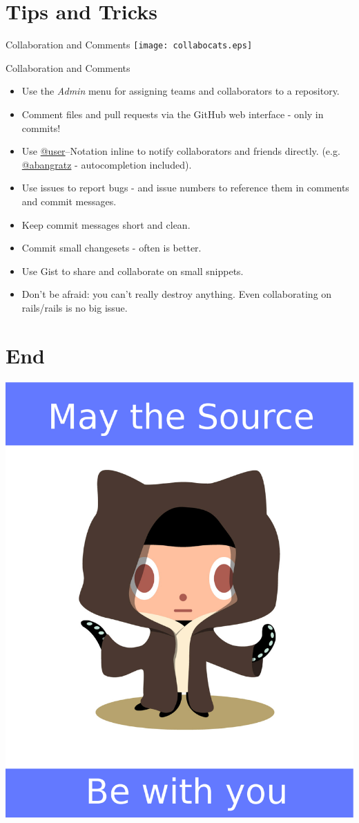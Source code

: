 \documentclass[style=husky,display=slidesnotes,clock=true]{powerdot}
\begin{document}
\section{Tips and Tricks}
\begin{slide}{Collaboration and Comments}
	\texttt{[image: collabocats.eps]}
\end{slide}
\begin{note}{Collaboration and Comments}
	\begin{itemize}
		\item Use the \textit{Admin} menu for assigning teams and collaborators to a repository.
		\item Comment files and pull requests via the GitHub web interface - only in commits!
		\item Use \url{@user}--Notation inline to notify collaborators and friends directly. (e.g. \url{@abangratz} -
			autocompletion included).
		\item Use issues to report bugs - and issue numbers to reference them in comments and commit messages.
		\item Keep commit messages short and clean.
		\item Commit small changesets - often is better.
		\item Use Gist to share and collaborate on small snippets.
		\item Don't be afraid: you can't really destroy anything. Even collaborating on rails/rails is no big issue.
	\end{itemize}
\end{note}
\section[tocsection=hidden,slide=false]{End}
\begin{emptyslide}{}
	\centering
	\includegraphics[scale=0.2]{octobiwan_source.eps}
\end{emptyslide}
\end{document}

